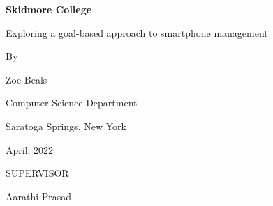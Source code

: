 \documentclass[12pt, title page, manuscript, nonacm]{acmart}
\begin{document}
\begin{titlepage}
\centering
{\Large\bfseries Skidmore College}

\vspace{1.5cm}

{\Large Exploring a goal-based approach to smartphone management}

\vspace{1cm}

{By}

\vspace{0.5cm}

{\large Zoe Beals}

\vspace{1cm}


{\large Computer Science Department}

\vspace{0.5cm}
{\large Saratoga Springs, New York}

\vspace{0.5cm}
{April, 2022}

\vspace{0.5cm}
{SUPERVISOR} 

{Aarathi Prasad}



\vfill

\end{titlepage}






\end{document}
